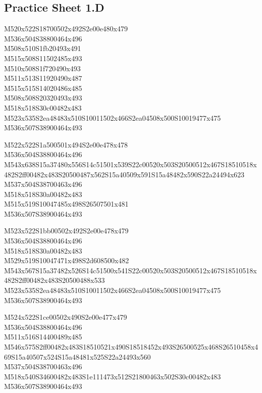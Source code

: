 \documentclass{article}
\begin{document}
\subsection{Practice Sheet 1.D}
\begin{multicols}{5}
\begin{center}

M520x522S18700502x492S2e00e480x479 %
\\M536x504S38800464x496 %
\\M508x510S1fb20493x491 %
\\M515x508S11502485x493 %
\\M510x508S1f720490x493 %
\\M511x513S11920490x487 %
\\M515x515S14020486x485 %
\\M508x508S20320493x493 %
\\M518x518S30c00482x483 %
\\M523x535S2ea48483x510S10011502x466S2ea04508x500S10019477x475 %
\\M536x507S38900464x493 %
\vfil
\columnbreak

M522x522S1a500501x494S2e00e478x478 %
\\M536x504S38800464x496 %
\\M543x638S15a37480x556S14c51501x539S22c00520x503S20500512x467S18510518x482S2ff00482x483S20500487x562S15a40509x591S15a48482x590S22a24494x623 %
\\M537x504S38700463x496 %
\\M518x518S30a00482x483 %
\\M515x519S10047485x498S26507501x481 %
\\M536x507S38900464x493 %
\vfil
\columnbreak

M523x522S1bb00502x492S2e00e478x479 %
\\M536x504S38800464x496 %
\\M518x518S30a00482x483 %
\\M529x519S10047471x498S2d608500x482 %
\\M543x567S15a37482x526S14c51500x541S22c00520x503S20500512x467S18510518x482S2ff00482x483S20500488x533 %
\\M523x535S2ea48483x510S10011502x466S2ea04508x500S10019477x475 %
\\M536x507S38900464x493 %
\vfil
\columnbreak

M524x522S1ce00502x490S2e00e477x479 %
\\M536x504S38800464x496 %
\\M511x516S14400489x485 %
\\M546x575S2ff00482x483S18510521x490S18518452x493S26500525x468S26510458x469S15a40507x524S15a48481x525S22a24493x560 %
\\M537x504S38700463x496 %
\\M518x540S34600482x483S1e111473x512S21800463x502S30c00482x483 %
\\M536x507S38900464x493 %
\vfil
\columnbreak


\end{center}
\end{multicols}
\end{document}

